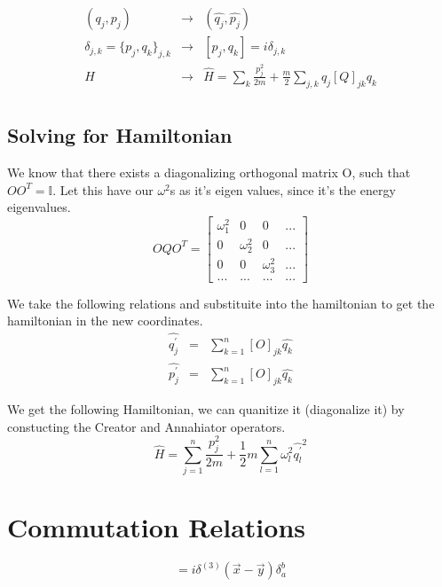 \begin{eqnarray}
  (q_j, p_j) &\longrightarrow& (\hat{q_j}, \hat{p_j}) \\
  \delta_{j, k} = \{p_j, q_k\}_{j, k} &\longrightarrow& [p_j, q_k] = i \delta_{j, k} \\
  H &\longrightarrow& \hat{H} = \sum_{k} \frac{p_j^2}{2m} + \frac{m}{2} \sum_{j, k} q_j [Q]_{jk} q_k \\
\end{eqnarray}

\subsection{Solving for Hamiltonian}

We know that there exists a diagonalizing orthogonal matrix O, such that $OO^T = \mathbb{I}$. Let this have our $\omega^2$s as it's eigen values, since it's the energy eigenvalues.
\begin{equation}
  O Q O^T = \begin{bmatrix}
    \omega_1^2 & 0 & 0 & ...\\
    0 & \omega_2^2 & 0 & ... \\
    0 & 0 & \omega_3^2 & ... \\
    ... & ... & ... & ...
  \end{bmatrix}
\end{equation}

We take the following relations and substituite into the hamiltonian to get the hamiltonian in the new coordinates.
\begin{eqnarray}
  \hat{q_j^\prime} &=& \sum_{k=1}^n [O]_{jk} \hat{q_k} \\
  \hat{p_j^\prime} &=& \sum_{k=1}^n [O]_{jk} \hat{q_k}
\end{eqnarray}

We get the following Hamiltonian, we can quanitize it (diagonalize it) by constucting the Creator and Annahiator operators.
\begin{equation}
  \hat{H} = \sum_{j=1}^n \frac{p_j^2}{2m} + \frac{1}{2} m \sum_{l=1}^{n} \omega_l^2 \hat{q_l^\prime}^2
\end{equation}



\section{Commutation Relations}

\begin{equation}
  [\Phi_a(x), \Pi^b(y)] = i \delta^{(3)}(\vec{x} - \vec{y}) \delta^b_a
\end{equation}


